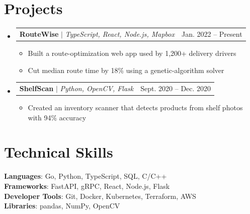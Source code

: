 \documentclass[letterpaper,11pt]{article}
\makeatletter
\newcommand{\resumeItem}[1]{
  \item\small{
    {#1 \vspace{-2pt}}
  }
}
\newcommand{\resumeProjectHeading}[2]{
    \item
    \begin{tabular*}{0.97\textwidth}{l@{\extracolsep{\fill}}r}
      \small#1 & #2 \\
    \end{tabular*}\vspace{-7pt}
}
\newcommand{\resumeSubHeadingListStart}{\begin{itemize}[leftmargin=0.15in, label={}]}
\newcommand{\resumeSubHeadingListEnd}{\end{itemize}}
\newcommand{\resumeItemListStart}{\begin{itemize}}
\newcommand{\resumeItemListEnd}{\end{itemize}\vspace{-5pt}}
\makeatother
\begin{document}

\section{Projects}
    \resumeSubHeadingListStart
      \resumeProjectHeading
          {\textbf{RouteWise} $|$ \emph{TypeScript, React, Node.js, Mapbox}}{Jan. 2022 -- Present}
          \resumeItemListStart
            \resumeItem{Built a route-optimization web app used by 1,200+ delivery drivers}
            \resumeItem{Cut median route time by 18\% using a genetic-algorithm solver}
          \resumeItemListEnd
      \resumeProjectHeading
          {\textbf{ShelfScan} $|$ \emph{Python, OpenCV, Flask}}{Sept. 2020 -- Dec. 2020}
          \resumeItemListStart
            \resumeItem{Created an inventory scanner that detects products from shelf photos with 94\% accuracy}
          \resumeItemListEnd
    \resumeSubHeadingListEnd


%
\section{Technical Skills}
 \begin{itemize}[leftmargin=0.15in, label={}]
    \small{\item{
     \textbf{Languages}{: Go, Python, TypeScript, SQL, C/C++} \\
     \textbf{Frameworks}{: FastAPI, gRPC, React, Node.js, Flask} \\
     \textbf{Developer Tools}{: Git, Docker, Kubernetes, Terraform, AWS} \\
     \textbf{Libraries}{: pandas, NumPy, OpenCV}
    }}
 \end{itemize}


\end{document}
